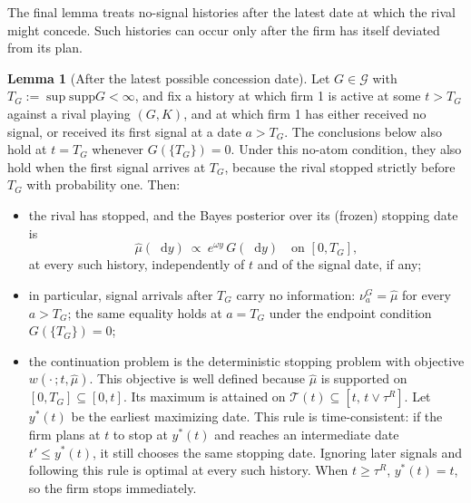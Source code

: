 \documentclass[12pt,reqno]{article}
\newcommand{\de}{\mathop{}\!\mathrm{d}}
\newcommand{\supp}{\mathrm{supp}}
\theoremstyle{definition} \newtheorem{example}{Example}
\theoremstyle{definition} \newtheorem{condition}{Condition}
\theoremstyle{definition} \newtheorem{corollary}{Corollary}
\theoremstyle{definition} \newtheorem{claim}{Claim}
\theoremstyle{definition} \newtheorem{definition}{Definition}
\theoremstyle{definition} \newtheorem{conjecture}{Conjecture}
\theoremstyle{definition} \newtheorem{Lemma}{Lemma}
\theoremstyle{definition} \newtheorem{lemma}{Lemma}
\theoremstyle{plain} \newtheorem{theorem}{Theorem}
\theoremstyle{definition} \newtheorem{assumption}{Assumption}
\theoremstyle{definition} \newtheorem*{assumptionnonumber}{Assumption}
\theoremstyle{definition} \newtheorem*{theoremNoNumber}{Proposition}
\theoremstyle{definition}
\theoremstyle{definition}\newtheorem{proposition}{Proposition}
\theoremstyle{definition} \newtheorem{result}{Result}
\theoremstyle{definition} \newtheorem*{definitionNoNumber}{Definition}
\theoremstyle{definition} \newtheorem{Definition}{Definition}
\theoremstyle{definition} \newtheorem*{DefinitionNoNumber}{Definition}
\theoremstyle{definition} \newtheorem*{fact}{Fact}
\theoremstyle{definition} \newtheorem*{property}{Property}
\theoremstyle{definition} \newtheorem{remark}{Remark}
\begin{document}
The final lemma treats no-signal histories after the latest date at which the rival might concede. Such histories can occur only after the firm has itself deviated from its plan.

\begin{lemma}[After the latest possible concession date]\label{lem:ex-memoryless}
Let $G\in\mathcal G$ with $T_G:=\sup\supp G<\infty$, and fix a history at which firm 1 is active at some $t>T_G$ against a rival playing $(G,K)$, and at which firm 1 has either received no signal, or received its first signal at a date $a>T_G$. The conclusions below also hold at $t=T_G$ whenever $G(\{T_G\})=0$. Under this no-atom condition, they also hold when the first signal arrives  at $T_G$, because the rival stopped strictly before $T_G$ with probability one. Then:
\begin{itemize}
\item[(i)] the rival has stopped, and the Bayes posterior over its (frozen) stopping date is
\[
\hat\mu(\de y)\ \propto\ e^{\omega y}\,G(\de y)\quad\text{on }[0,T_G],
\]
at every such history, independently of $t$ and of the signal date, if any;
\item[(ii)] in particular, signal arrivals after $T_G$ carry no information: $\nu^G_a=\hat\mu$ for every $a>T_G$; the same equality holds at $a=T_G$ under the endpoint condition $G(\{T_G\})=0$;
\item[(iii)] the continuation problem is the deterministic stopping problem with objective
$
w(\cdot\,;t,\hat\mu).
$
This objective is well defined because $\hat\mu$ is supported on $[0,T_G]\subseteq[0,t]$. Its maximum is attained on $\mathcal T(t)\subseteq[t,\,t\vee\tau^R]$. Let $y^\ast(t)$ be the earliest maximizing date. This rule is time-consistent: if the firm plans at $t$ to stop at $y^\ast(t)$ and reaches an intermediate date $t'\le y^\ast(t)$, it still chooses the same stopping date. Ignoring later signals and following this rule is optimal at every such history. When $t\ge\tau^R$, $y^\ast(t)=t$, so the firm stops immediately.
\end{itemize}
\end{lemma}
\end{document}
